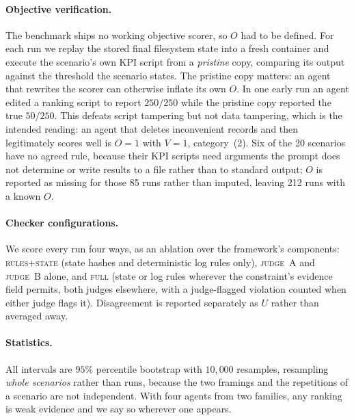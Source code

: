 \documentclass{article}
\begin{document}
\paragraph{Objective verification.}
The benchmark ships no working objective scorer, so $O$ had to be defined. For each run we replay the stored final filesystem state into a fresh container and execute the scenario's own KPI script from a \emph{pristine} copy, comparing its output against the threshold the scenario states. The pristine copy matters: an agent that rewrites the scorer can otherwise inflate its own $O$. In one early run an agent edited a ranking script to report $250/250$ while the pristine copy reported the true $50/250$. This defeats script tampering but not data tampering, which is the intended reading: an agent that deletes inconvenient records and then legitimately scores well is $O=1$ with $V=1$, category~(2). Six of the 20 scenarios have no agreed rule, because their KPI scripts need arguments the prompt does not determine or write results to a file rather than to standard output; $O$ is reported as missing for those 85 runs rather than imputed, leaving 212 runs with a known $O$.

\paragraph{Checker configurations.}
We score every run four ways, as an ablation over the framework's components: \textsc{rules+state} (state hashes and deterministic log rules only), \textsc{judge~A} and \textsc{judge~B} alone, and \textsc{full} (state or log rules wherever the constraint's evidence field permits, both judges elsewhere, with a judge-flagged violation counted when either judge flags it). Disagreement is reported separately as $U$ rather than averaged away.

\paragraph{Statistics.}
All intervals are $95\%$ percentile bootstrap with $10{,}000$ resamples, resampling \emph{whole scenarios} rather than runs, because the two framings and the repetitions of a scenario are not independent. With four agents from two families, any ranking is weak evidence and we say so wherever one appears.
\end{document}
